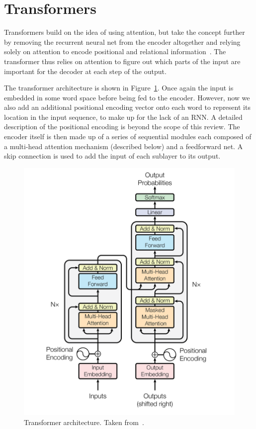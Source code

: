 \section{Transformers}

Transformers build on the idea of using attention, but take the concept further by removing the recurrent neural net from the encoder altogether and relying solely on attention to encode positional and relational information~\cite{transformer}. The transformer thus relies on attention to figure out which parts of the input are important for the decoder at each step of the output.

The transformer architecture is shown in Figure~\ref{fig:transformer}. Once again the input is embedded in some word space before being fed to the encoder. However, now we also add an additional positional encoding vector onto each word to represent its location in the input sequence, to make up for the lack of an RNN. A detailed description of the positional encoding is beyond the scope of this review. The encoder itself is then made up of a series of sequential modules each composed of a multi-head attention mechanism (described below) and a feedforward net. A skip connection is used to add the input of each sublayer to its output.

\begin{figure}[htbp]
    \centering
    \includegraphics[width=0.7\linewidth]{Images/ML/transformer.png}
    \caption{Transformer architecture. Taken from~\cite{transformer}.}
    \label{fig:transformer}
\end{figure}

